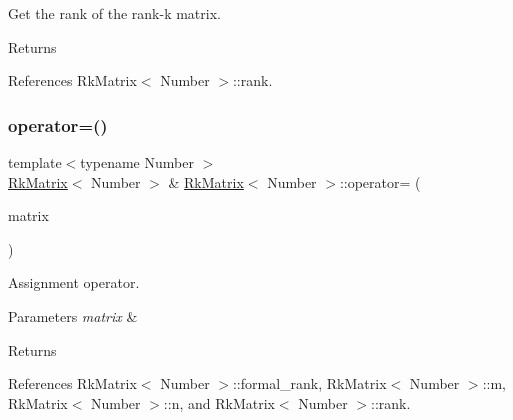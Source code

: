 Get the rank of the rank-\/k matrix. \begin{DoxyReturn}{Returns}

\end{DoxyReturn}


References Rk\+Matrix$<$ Number $>$\+::rank.

\mbox{\label{classRkMatrix_a8894542d0a6cda34a78cccf34eb3f990}} 
\subsubsection{\texorpdfstring{operator=()}{operator=()}}
{\footnotesize\ttfamily template$<$typename Number $>$ \\
\hyperlink{classRkMatrix}{Rk\+Matrix}$<$ Number $>$ \& \hyperlink{classRkMatrix}{Rk\+Matrix}$<$ Number $>$\+::operator= (\begin{DoxyParamCaption}\item[{const \hyperlink{classRkMatrix}{Rk\+Matrix}$<$ Number $>$ \&}]{matrix }\end{DoxyParamCaption})}

Assignment operator. 
\begin{DoxyParams}{Parameters}
{\em matrix} & \\
\hline
\end{DoxyParams}
\begin{DoxyReturn}{Returns}

\end{DoxyReturn}


References Rk\+Matrix$<$ Number $>$\+::formal\+\_\+rank, Rk\+Matrix$<$ Number $>$\+::m, Rk\+Matrix$<$ Number $>$\+::n, and Rk\+Matrix$<$ Number $>$\+::rank.

\mbox{\label{classRkMatrix_aeccb86734649be94a64d76cb613eea79}} 
